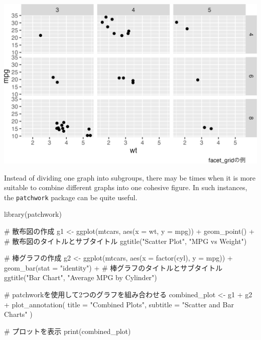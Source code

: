 \documentclass[
  a4paper,
]{book}
\newenvironment{Shaded}{\begin{snugshade}}{\end{snugshade}}
\newcommand{\AttributeTok}[1]{\textcolor[rgb]{0.40,0.45,0.13}{#1}}
\newcommand{\CommentTok}[1]{\textcolor[rgb]{0.37,0.37,0.37}{#1}}
\newcommand{\FunctionTok}[1]{\textcolor[rgb]{0.28,0.35,0.67}{#1}}
\newcommand{\NormalTok}[1]{\textcolor[rgb]{0.00,0.23,0.31}{#1}}
\newcommand{\OtherTok}[1]{\textcolor[rgb]{0.00,0.23,0.31}{#1}}
\newcommand{\SpecialCharTok}[1]{\textcolor[rgb]{0.37,0.37,0.37}{#1}}
\newcommand{\StringTok}[1]{\textcolor[rgb]{0.13,0.47,0.30}{#1}}
\begin{document}
\includegraphics{chapter04_files/figure-pdf/exampleFacetGrid-1.png}

Instead of dividing one graph into subgroups, there may be times when it
is more suitable to combine different graphs into one cohesive figure.
In such instances, the \texttt{patchwork} package can be quite useful.

\begin{Shaded}
\begin{Highlighting}[]
\FunctionTok{library}\NormalTok{(patchwork)}

\CommentTok{\# 散布図の作成}
\NormalTok{g1 }\OtherTok{\textless{}{-}} \FunctionTok{ggplot}\NormalTok{(mtcars, }\FunctionTok{aes}\NormalTok{(}\AttributeTok{x =}\NormalTok{ wt, }\AttributeTok{y =}\NormalTok{ mpg)) }\SpecialCharTok{+}
  \FunctionTok{geom\_point}\NormalTok{() }\SpecialCharTok{+}
  \CommentTok{\# 散布図のタイトルとサブタイトル}
  \FunctionTok{ggtitle}\NormalTok{(}\StringTok{"Scatter Plot"}\NormalTok{, }\StringTok{"MPG vs Weight"}\NormalTok{)}

\CommentTok{\# 棒グラフの作成}
\NormalTok{g2 }\OtherTok{\textless{}{-}} \FunctionTok{ggplot}\NormalTok{(mtcars, }\FunctionTok{aes}\NormalTok{(}\AttributeTok{x =} \FunctionTok{factor}\NormalTok{(cyl), }\AttributeTok{y =}\NormalTok{ mpg)) }\SpecialCharTok{+}
  \FunctionTok{geom\_bar}\NormalTok{(}\AttributeTok{stat =} \StringTok{"identity"}\NormalTok{) }\SpecialCharTok{+}
  \CommentTok{\# 棒グラフのタイトルとサブタイトル}
  \FunctionTok{ggtitle}\NormalTok{(}\StringTok{"Bar Chart"}\NormalTok{, }\StringTok{"Average MPG by Cylinder"}\NormalTok{)}

\CommentTok{\# patchworkを使用して2つのグラフを組み合わせる}
\NormalTok{combined\_plot }\OtherTok{\textless{}{-}}\NormalTok{ g1 }\SpecialCharTok{+}\NormalTok{ g2 }\SpecialCharTok{+}
  \FunctionTok{plot\_annotation}\NormalTok{(}
    \AttributeTok{title =} \StringTok{"Combined Plots"}\NormalTok{,}
    \AttributeTok{subtitle =} \StringTok{"Scatter and Bar Charts"}
\NormalTok{  )}

\CommentTok{\# プロットを表示}
\FunctionTok{print}\NormalTok{(combined\_plot)}
\end{Highlighting}
\end{Shaded}
\end{document}
